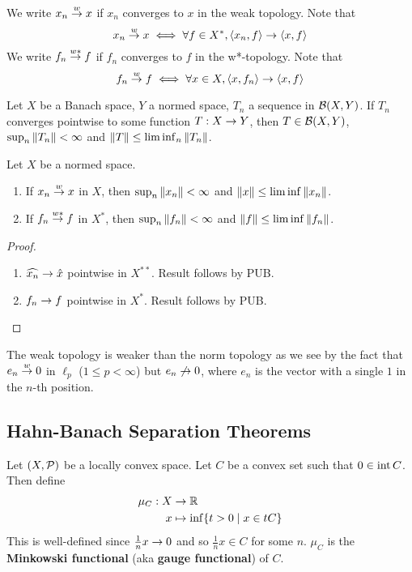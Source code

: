 \documentclass{article}
\begin{document}
\begin{notation}
  We write $x_n \overset w{\rightarrow} x$ if $x_n$ converges to $x$ in the weak topology. Note that
  $$x_n \overset w{\rightarrow} x \iff \forall f \in X^*, \left\langle x_n, f\right\rangle \rightarrow \left\langle x, f\right\rangle$$
  We write $f_n \overset{w*}{\rightarrow} f$ if $f_n$ converges to $f$ in the w*-topology. Note that
  $$f_n \overset w{\rightarrow} f \iff \forall x \in X, \left\langle x, f_n\right\rangle \rightarrow \left\langle x, f\right\rangle$$
\end{notation}

\begin{thm}
  Let $X$ be a Banach space, $Y$ a normed space, $T_n$ a sequence in $\mathcal B(X, Y)$. If $T_n$ converges pointwise to some function $T : X \rightarrow Y$, then $T \in \mathcal B(X, Y)$, $\sup_n \left\lVert T_n\right\rVert < \infty$ and $\left\lVert T\right\rVert \le \liminf_n \left\lVert T_n\right\rVert$.
\end{thm}

\begin{nprop}
  Let $X$ be a normed space.
  \begin{enumerate}
    \item If $x_n \overset w{\rightarrow} x$ in $X$, then $\sup_n \left\lVert x_n\right\rVert < \infty$ and $\left\lVert x\right\rVert \le \liminf \left\lVert x_n\right\rVert$.
    \item If $f_n \overset{w*}{\rightarrow} f$ in $X^*$, then $\sup_n \left\lVert f_n\right\rVert < \infty$ and $\left\lVert f\right\rVert \le \liminf \left\lVert f_n\right\rVert$.
  \end{enumerate}
\end{nprop}
\begin{proof}~
  \begin{enumerate}
    \item $\widehat{x_n} \rightarrow \hat x$ pointwise in $X^{**}$. Result follows by PUB.
    \item $f_n \rightarrow f$ pointwise in $X^*$. Result follows by PUB.
  \end{enumerate}
\end{proof}

\newlec

The weak topology is weaker than the norm topology as we see by the fact that $e_n \overset w{\rightarrow} 0$ in $\ell_p$ ($1 \le p < \infty$) but $e_n \not\rightarrow 0$, where $e_n$ is the vector with a single $1$ in the $n$-th position.

\subsection{Hahn-Banach Separation Theorems}

Let $(X, \mathcal P)$ be a locally convex space. Let $C$ be a convex set such that $0 \in \operatorname{int} C$. Then define
\begin{align*}
  \mu_C : X & \rightarrow \mathbb R \\
  x & \mapsto \inf \{t > 0 \mid x \in tC\}
\end{align*}
This is well-defined since $\frac 1n x \rightarrow 0$ and so $\frac 1n x \in C$ for some $n$. $\mu_C$ is the {\bf Minkowski functional} (aka {\bf gauge functional}) of $C$.
\end{document}
